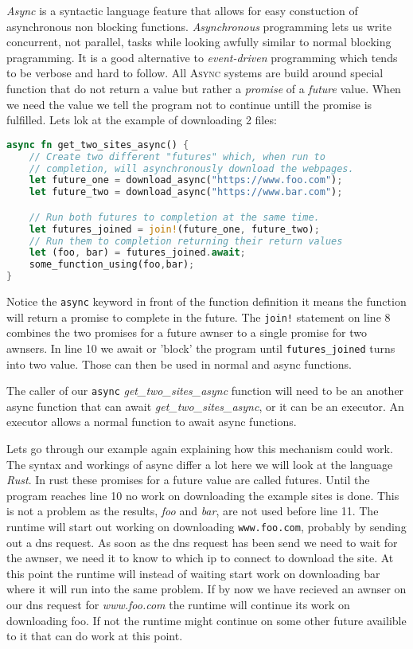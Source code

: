 \textit{Async} is a syntactic language feature that allows for easy constuction of asynchronous non blocking functions. \textit{Asynchronous} programming lets us write concurrent, not parallel, tasks while looking awfully similar to normal blocking pragramming. It is a good alternative to \textit{event-driven} programming which tends to be verbose and hard to follow. All \textsc{Async} systems are build around special function that do not return a value but rather a \textit{promise} of a \textit{future} value. When we need the value we tell the program not to continue untill the promise is fulfilled. Lets lok at the example of downloading 2 files:

\begin{lstlisting}[language=rust, style=boxed, tabsize=2]
async fn get_two_sites_async() {
	// Create two different "futures" which, when run to 
	// completion, will asynchronously download the webpages.
	let future_one = download_async("https://www.foo.com");
	let future_two = download_async("https://www.bar.com");

	// Run both futures to completion at the same time.
	let futures_joined = join!(future_one, future_two);
	// Run them to completion returning their return values
	let (foo, bar) = futures_joined.await;
	some_function_using(foo,bar);
}
\end{lstlisting}

Notice the \texttt{async} keyword in front of the function definition it means the function will return a promise to complete in the future. The \texttt{join!} statement on line 8 combines the two promises for a future awnser to a single promise for two awnsers. In line 10 we await or 'block' the program until \texttt{futures\_joined} turns into two value. Those can then be used in normal and async functions.

The caller of our \texttt{async} \textit{get\_two\_sites\_async} function will need to be an another async function that can await \textit{get\_two\_sites\_async}, or it can be an executor. An executor allows a normal function to await async functions.

Lets go through our example again explaining how this mechanism could work. The syntax and workings of async differ a lot here we will look at the language \textit{Rust}. In rust these promises for a future value are called futures. Until the program reaches line 10 no work on downloading the example sites is done. This is not a problem as the results, \textit{foo} and \textit{bar}, are not used before line 11. The runtime will start out working on downloading \texttt{www.foo.com}, probably by sending out a dns request. As soon as the dns request has been send we need to wait for the awnser, we need it to know to which ip to connect to download the site. At this point the runtime will instead of waiting start work on downloading bar where it will run into the same problem. If by now we have recieved an awnser on our dns request for \textit{www.foo.com} the runtime will continue its work on downloading foo. If not the runtime might continue on some other future availible to it that can do work at this point.
